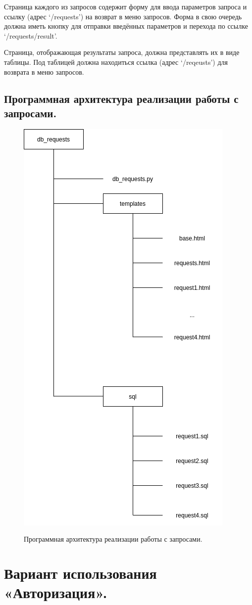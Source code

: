 \documentclass[12pt, a4paper]{article}
\begin{document}
    Страница каждого из запросов содержит форму для ввода параметров запроса и ссылку
    (адрес ‘/requests’) на возврат в меню запросов. Форма в свою очередь должна иметь кнопку
    для отправки введённых параметров и перехода по ссылке ‘/requests/result’.
    
    Страница, отображающая результаты запроса, должна представлять их в виде таблицы. Под
    таблицей должна находиться ссылка (адрес ‘/reqeusts’) для возврата в меню запросов.
    
    \subsection{Программная архитектура реализации работы с запросами.}
    \begin{figure}[h]
    	\centering    %
    	\includegraphics[height=0.9\textwidth]{pictures/requests_arch.png}
    	\label{fig:pic6} %
    	\caption{Программная архитектура реализации работы с запросами.}
    \end{figure}
    
    \section{Вариант использования «Авторизация». }
\end{document}
